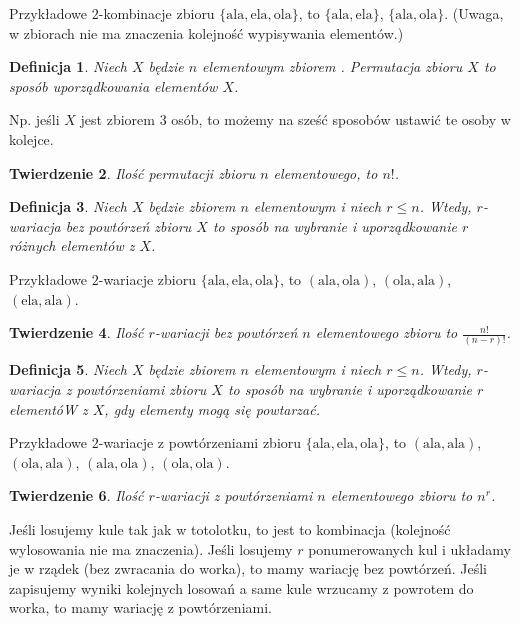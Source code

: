 \documentclass[12pt]{article}
\newtheorem{thm}{Twierdzenie}
\newtheorem{dfn}[thm]{Definicja}
\newcommand{\ala}{\textrm{ala}}
\newcommand{\ela}{\textrm{ela}}
\newcommand{\ola}{\textrm{ola}}
\begin{document}
Przykładowe $2$-kombinacje zbioru $\{\ala, \ela, \ola\}$,
to $\{\ala, \ela\}$, $\{\ala, \ola\}$.
(Uwaga, w zbiorach nie ma znaczenia kolejność wypisywania
elementów.)


\begin{dfn}
Niech $X$ będzie $n$ elementowym zbiorem .
Permutacja zbioru $X$ to sposób uporządkowania 
elementów $X$.
\end{dfn} 

Np. jeśli $X$ jest zbiorem $3$ osób, to możemy
na sześć sposobów ustawić te osoby w kolejce.



\begin{thm}
	Ilość permutacji zbioru $n$ elementowego,
	to $n!$.
\end{thm}


\begin{dfn}
	Niech $X$ będzie zbiorem $n$ elementowym i niech $r\leq n$.
	Wtedy, $r$-wariacja bez powtórzeń zbioru $X$ to sposób na wybranie i uporządkowanie $r$ różnych elementów z $X$.
\end{dfn} 

Przykładowe $2$-wariacje zbioru $\{\ala, \ela, \ola\}$,
to $(\ala, \ola)$, $(\ola, \ala)$, $(\ela, \ala)$.

\begin{thm}
	Ilość $r$-wariacji bez powtórzeń $n$ elementowego zbioru 
	to $\frac{n!}{(n-r)!}$.
\end{thm}

\begin{dfn}
	Niech $X$ będzie zbiorem $n$ elementowym i niech $r\leq n$.
	Wtedy, $r$-wariacja z powtórzeniami zbioru $X$ to sposób na wybranie i uporządkowanie $r$ elementóW z $X$, gdy elementy mogą się powtarzać.
\end{dfn} 

Przykładowe $2$-wariacje z powtórzeniami 
zbioru $\{\ala, \ela, \ola\}$,
to $(\ala, \ala)$, $(\ola, \ala)$, 
$(\ala, \ola)$, $(\ola, \ola)$.


\begin{thm}
	Ilość $r$-wariacji z powtórzeniami $n$ elementowego zbioru 
	to $n^r$.
\end{thm}

Jeśli losujemy kule tak jak w totolotku, to jest to kombinacja 
(kolejność wylosowania nie ma znaczenia).
Jeśli losujemy $r$ ponumerowanych kul 
i układamy je w rządek (bez zwracania do worka), to mamy
wariację bez powtórzeń. Jeśli zapisujemy wyniki kolejnych losowań a same kule wrzucamy z powrotem do worka, to mamy
wariację z powtórzeniami.
\bigskip
\end{document}
